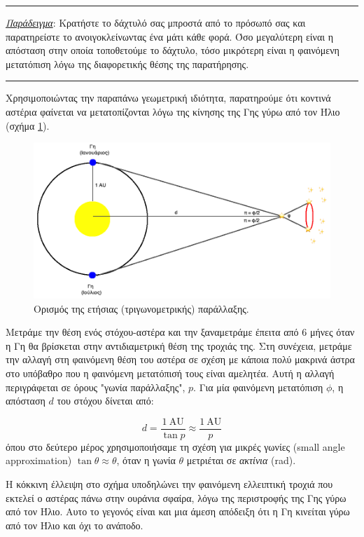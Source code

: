 \hrule
\textit{\underline{Παράδειγμα}}: Κρατήστε το δάχτυλό σας μπροστά από το πρόσωπό σας και παρατηρείστε το ανοιγοκλείνωντας ένα μάτι κάθε φορά. Όσο μεγαλύτερη είναι η απόσταση στην οποία τοποθετούμε το δάχτυλο, τόσο μικρότερη είναι η φαινόμενη μετατόπιση λόγω της διαφορετικής θέσης της παρατήρησης.
\hrule

Χρησιμοποιώντας την παραπάνω γεωμετρική ιδιότητα, παρατηρούμε ότι κοντινά αστέρια φαίνεται να μετατοπίζονται λόγω της κίνησης της Γης γύρω από τον Ήλιο (σχήμα \ref{fig:parallax}).

\begin{figure}[h]
    \centering
    \includegraphics[width=\linewidth]{Figures/parallax.png}
    \caption{Ορισμός της ετήσιας (τριγωνομετρικής) παράλλαξης.}
    \label{fig:parallax}
\end{figure}

Μετράμε την θέση ενός στόχου-αστέρα και την ξαναμετράμε έπειτα από 6 μήνες όταν η Γη θα βρίσκεται στην αντιδιαμετρική θέση της τροχιάς της. Στη συνέχεια, μετράμε την αλλαγή στη φαινόμενη θέση του αστέρα σε σχέση με κάποια πολύ μακρινά άστρα στο υπόβαθρο που η φαινόμενη μετατόπισή τους είναι αμελητέα. Αυτή η αλλαγή περιγράφεται σε όρους "γωνία παράλλαξης", $p$. Για μία φαινόμενη μετατόπιση $\phi$, η απόσταση $d$ του στόχου δίνεται από:

\begin{equation}
    d = \frac{1 \ \text{AU}}{\tan p} \approx \frac{1 \ \text{AU}}{p}
\end{equation}
όπου στο δεύτερο μέρος χρησιμοποιήσαμε τη σχέση για μικρές γωνίες (small angle approximation) $\tan \theta \approx \theta$, όταν η γωνία $\theta$ μετριέται σε \textit{ακτίνια} (rad).

Η κόκκινη έλλειψη στο σχήμα υποδηλώνει την φαινόμενη ελλειπτική τροχιά που εκτελεί ο αστέρας πάνω στην ουράνια σφαίρα, λόγω της περιστροφής της Γης γύρω από τον Ήλιο. Αυτο το γεγονός είναι και μια άμεση απόδειξη ότι η Γη κινείται γύρω από τον Ήλιο και όχι το ανάποδο.

